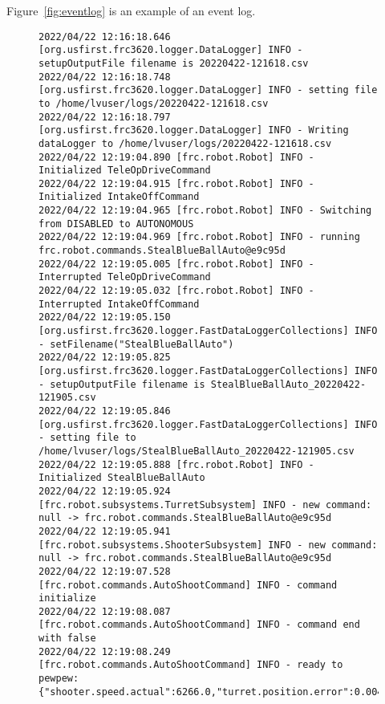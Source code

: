 \documentclass[]{article}
\begin{document}
\begin{itemize}[topsep=0pt]
Figure~\ref{fig:eventlog} is an example of an event log.
\begin{figure}[h]
\begin{mdframed}
\begin{lstlisting}[basicstyle=\ttfamily\tiny]
2022/04/22 12:16:18.646 [org.usfirst.frc3620.logger.DataLogger] INFO - setupOutputFile filename is 20220422-121618.csv
2022/04/22 12:16:18.748 [org.usfirst.frc3620.logger.DataLogger] INFO - setting file to /home/lvuser/logs/20220422-121618.csv
2022/04/22 12:16:18.797 [org.usfirst.frc3620.logger.DataLogger] INFO - Writing dataLogger to /home/lvuser/logs/20220422-121618.csv
2022/04/22 12:19:04.890 [frc.robot.Robot] INFO - Initialized TeleOpDriveCommand
2022/04/22 12:19:04.915 [frc.robot.Robot] INFO - Initialized IntakeOffCommand
2022/04/22 12:19:04.965 [frc.robot.Robot] INFO - Switching from DISABLED to AUTONOMOUS
2022/04/22 12:19:04.969 [frc.robot.Robot] INFO - running frc.robot.commands.StealBlueBallAuto@e9c95d
2022/04/22 12:19:05.005 [frc.robot.Robot] INFO - Interrupted TeleOpDriveCommand
2022/04/22 12:19:05.032 [frc.robot.Robot] INFO - Interrupted IntakeOffCommand
2022/04/22 12:19:05.150 [org.usfirst.frc3620.logger.FastDataLoggerCollections] INFO - setFilename("StealBlueBallAuto")
2022/04/22 12:19:05.825 [org.usfirst.frc3620.logger.FastDataLoggerCollections] INFO - setupOutputFile filename is StealBlueBallAuto_20220422-121905.csv
2022/04/22 12:19:05.846 [org.usfirst.frc3620.logger.FastDataLoggerCollections] INFO - setting file to /home/lvuser/logs/StealBlueBallAuto_20220422-121905.csv
2022/04/22 12:19:05.888 [frc.robot.Robot] INFO - Initialized StealBlueBallAuto
2022/04/22 12:19:05.924 [frc.robot.subsystems.TurretSubsystem] INFO - new command: null -> frc.robot.commands.StealBlueBallAuto@e9c95d
2022/04/22 12:19:05.941 [frc.robot.subsystems.ShooterSubsystem] INFO - new command: null -> frc.robot.commands.StealBlueBallAuto@e9c95d
2022/04/22 12:19:07.528 [frc.robot.commands.AutoShootCommand] INFO - command initialize
2022/04/22 12:19:08.087 [frc.robot.commands.AutoShootCommand] INFO - command end with false
2022/04/22 12:19:08.249 [frc.robot.commands.AutoShootCommand] INFO - ready to pewpew: {"shooter.speed.actual":6266.0,"turret.position.error":0.004673555493354797,"vision.range":11.44796097925103,"vision.xdegrees":-1.6890519857406616,"vision.ylocation":9.09293270111084,"shooter.speed.requested":6269.568892321029,"turret.position.requested":176.97703988850117,"turret.position.actual":176.9723663330078,"hood.position.requested":16.543897731650887,"shooter.speed.ratio":0.9994307595334984,"hood.position.ratio":0.9887104353479965,"hood.position.actual":16.35712432861328}

\end{lstlisting}
\end{mdframed}
\end{figure}
\end{itemize}
\end{document}
